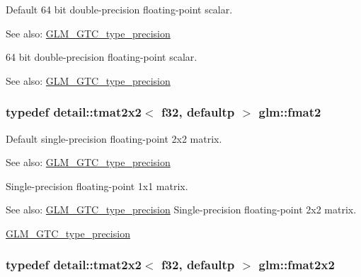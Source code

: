 Default 64 bit double-precision floating-point scalar. \begin{Desc}
\item[See also:]\hyperlink{group__gtc__type__precision}{GLM\_\-GTC\_\-type\_\-precision}\end{Desc}
64 bit double-precision floating-point scalar. \begin{Desc}
\item[See also:]\hyperlink{group__gtc__type__precision}{GLM\_\-GTC\_\-type\_\-precision} \end{Desc}
\hypertarget{group__gtc__type__precision_g96b15c5eaecce87b352dab5d373da979}{
\subsubsection[fmat2]{\setlength{\rightskip}{0pt plus 5cm}typedef detail::tmat2x2$<$ f32, defaultp $>$ {\bf glm::fmat2}}}
\label{group__gtc__type__precision_g96b15c5eaecce87b352dab5d373da979}


Default single-precision floating-point 2x2 matrix. \begin{Desc}
\item[See also:]\hyperlink{group__gtc__type__precision}{GLM\_\-GTC\_\-type\_\-precision}\end{Desc}
Single-precision floating-point 1x1 matrix. \begin{Desc}
\item[See also:]\hyperlink{group__gtc__type__precision}{GLM\_\-GTC\_\-type\_\-precision} Single-precision floating-point 2x2 matrix. 

\hyperlink{group__gtc__type__precision}{GLM\_\-GTC\_\-type\_\-precision} \end{Desc}
\hypertarget{group__gtc__type__precision_gda7823c23ae249dccaecb5a016c667f4}{
\subsubsection[fmat2x2]{\setlength{\rightskip}{0pt plus 5cm}typedef detail::tmat2x2$<$ f32, defaultp $>$ {\bf glm::fmat2x2}}}
\label{group__gtc__type__precision_gda7823c23ae249dccaecb5a016c667f4}


